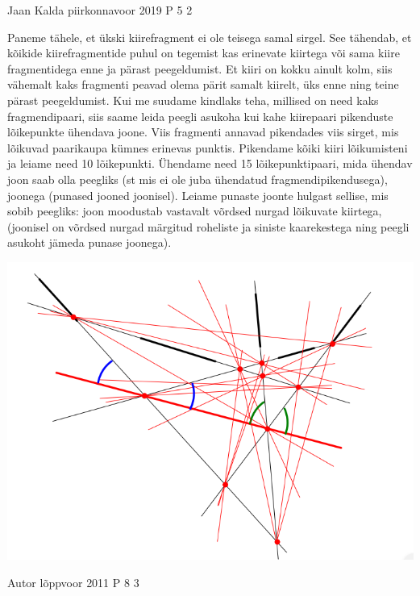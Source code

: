 \documentclass[11pt]{article}
\begin{document}
{%
{Jaan Kalda} %
{piirkonnavoor} %
{2019} %
{P 5} %
{2} %
{

\ifSolution
Paneme tähele, et ükski kiirefragment ei ole teisega samal sirgel. See tähendab, et kõikide kiirefragmentide puhul on tegemist kas erinevate kiirtega või sama kiire fragmentidega enne ja pärast peegeldumist. Et kiiri on kokku ainult kolm, siis vähemalt kaks fragmenti peavad olema pärit samalt kiirelt, üks enne ning teine pärast peegeldumist. Kui me suudame kindlaks teha, millised on need kaks fragmendipaari, siis saame leida peegli asukoha kui kahe kiirepaari pikenduste lõikepunkte ühendava joone. Viis fragmenti annavad pikendades viis sirget, mis lõikuvad paarikaupa kümnes erinevas punktis. Pikendame kõiki kiiri lõikumisteni ja leiame need 10 lõikepunkti. Ühendame need 15 lõikepunktipaari, mida ühendav joon saab olla peegliks (st mis ei ole juba ühendatud fragmendipikendusega), joonega (punased jooned joonisel). Leiame punaste joonte hulgast sellise, mis sobib peegliks: joon moodustab vastavalt võrdsed nurgad lõikuvate kiirtega, (joonisel on võrdsed nurgad märgitud roheliste ja siniste kaarekestega ning peegli asukoht jämeda punase joonega).
\begin{center}
	\includegraphics[width=0.5\linewidth]{2019-v2p-05-lah.PNG}
\end{center}
\fi
}


{Autor} %
{lõppvoor} %
{2011} %
{P 8} %
{3} %
{

}}
\end{document}
